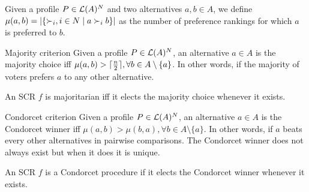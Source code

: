 	Given a profile $P\in\mathcal{L}(A)^{N}$ and two alternatives $a,b\in A$, we define $\mu(a,b)=|\{\mathbin{\prefi}, i \in N \suchthat a\prefi b\}|$ as the number of preference rankings for which $a$ is preferred to $b$. 
	
	\begin{genthm}{Majority criterion}
	Given a profile $P\in\mathcal{L}(A)^{N}$, an alternative $a\in A$ is the majority choice iff $\mu(a,b)> \lceil\frac{n}{2}\rceil, \forall b\in{A\setminus{\{a\}}}$. In other words, if the majority of voters prefers $a$ to any other alternative.
	
	An \acs{SCR} $f$ is majoritarian iff it elects the majority choice whenever it exists.
	\end{genthm}
	
	\begin{genthm}{Condorcet criterion}
	Given a profile $P\in\mathcal{L}(A)^{N}$, an alternative $a\in A$ is the Condorcet winner iff $\mu(a,b)> \mu(b,a), \forall b\in{A\setminus{\{a\}}}$. In other words, if $a$ beats every other alternatives in pairwise comparisons. The Condorcet winner does not always exist but when it does it is unique.
	
	An \acs{SCR} $f$ is a Condorcet procedure if it elects the Condorcet winner whenever it exists.	
	\end{genthm}

